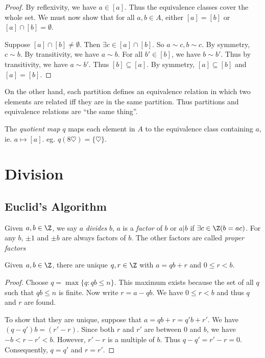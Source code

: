 \documentclass[a4paper]{article}
\begin{document}
  \begin{proof}
    By reflexivity, we have $a\in [a]$. Thus the equivalence classes cover the whole set. We must now show that for all $a, b\in A$, either $[a] = [b]$ or $[a]\cap [b]=\emptyset$.

    Suppose $[a]\cap[b]\not=\emptyset$. Then $\exists c\in [a]\cap[b]$. So $a\sim c, b\sim c$. By symmetry, $c\sim b$. By transitivity, we have $a\sim b$. For all $b'\in [b]$, we have $b\sim b'$. Thus by transitivity, we have $a\sim b'$. Thus $[b]\subseteq[a]$. By symmetry, $[a]\subseteq[b]$  and $[a] = [b]$.
  \end{proof}

  On the other hand, each partition defines an equivalence relation in which two elements are related iff they are in the same partition. Thus partitions and equivalence relations are ``the same thing''.
  \begin{defi}
    The \emph{quotient map} $q$ maps each element in $A$ to the equivalence class containing $a$, ie. $a\mapsto [a]$. eg. $q(8\heartsuit) = \{\heartsuit\}$.
  \end{defi}

  \section{Division}
  \subsection{Euclid's Algorithm}
  \begin{defi}
    Given $a, b\in \Z$, we say $a$ \emph{divides} $b$, $a$ is a \emph{factor} of $b$ or $a|b$ if $\exists c\in \Z(b = ac)$. For any $b$, $\pm 1$ and $\pm b$ are always factors of $b$. The other factors are called \emph{proper factors}
  \end{defi}

  \begin{thm}
    Given $a, b\in \Z$, there are unique $q, r\in \Z$ with $a = qb + r$ and $0\leq r < b$.
  \end{thm}

  \begin{proof}
    Choose $q = \max\{q:qb \leq n\}$. This maximum exists because the set of all $q$ such that $qb\leq n$ is finite. Now write $r = a - qb$. We have $0\leq r < b$ and thus $q$ and $r$ are found.

    To show that they are unique, suppose that $a = qb + r = q'b + r'$. We have $(q - q')b = (r' - r)$. Since both $r$ and $r'$ are between $0$ and $b$, we have $-b < r - r' < b$. However, $r' - r$ is a multiple of $b$. Thus $q - q' = r' - r = 0$. Consequently, $q = q'$ and $r = r'$.
  \end{proof}
\end{document}
